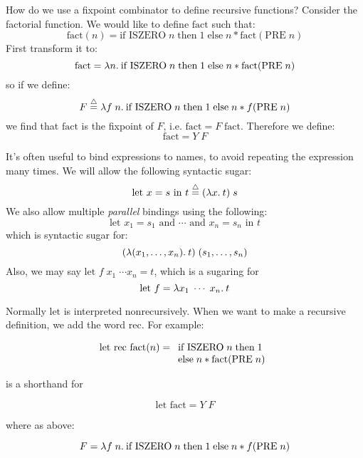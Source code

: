 \begin{slide*}


\vspace*{0.5cm}

How do we use a fixpoint combinator to define recursive functions? Consider the
factorial function. We would like to define {\red $\mbox{fact}$} such that:
{\red $$ \mbox{fact}(n) = \mbox{if ISZERO}\; n\; \mbox{then}\; 1\;
         \mbox{else}\; n * \mbox{fact}(\mbox{PRE}\; n) $$}
\noindent First transform it to:
{\red $$ \mbox{fact} = \lambda n.\: \mbox{if ISZERO}\; n\; \mbox{then}\; 1\;
    \mbox{else}\; n * \mbox{fact}(\mbox{PRE}\; n) $$}
\noindent so if we define:
{\red $$F \stackrel{\bigtriangleup}{=} \lambda f\; n.\: \mbox{if ISZERO}\; n\; \mbox{then}\; 1\;
    \mbox{else}\; n * f(\mbox{PRE}\; n)$$}
we find that {\red $\mbox{fact}$} is the fixpoint of {\red $F$}, i.e. {\red
$\mbox{fact} = F\; \mbox{fact}$}. Therefore we define:
{\red $$\mbox{fact} = Y\; F$$}

\end{slide*}



\begin{slide*}


\vspace*{0.5cm}

It's often useful to bind expressions to names, to avoid repeating the
expression many times. We will allow the following syntactic sugar:
{\red $$ \mbox{let } x = s \mbox{ in } t \stackrel{\bigtriangleup}{=} (\lambda x.\: t)\; s $$}
We also allow multiple {\em parallel} bindings using the following:
{\red $$ \mbox{let } x_1 = s_1 \mbox{ and } \cdots \mbox{ and } x_n = s_n
         \mbox{ in } t $$}
which is syntactic sugar for:
{\red $$ (\lambda (x_1,\ldots,x_n).\: t)\; (s_1,\ldots,s_n) $$}
Also, we may say {\red $\mbox{let } f\; x_1\; \cdots x_n = t$},
which is a sugaring for
{\red $$\mbox{let } f = \lambda x_1\; \cdots \; x_n.\: t$$}
\end{slide*}



\begin{slide*}


\vspace*{0.5cm}

Normally {\red $\mbox{let}$} is interpreted nonrecursively. When we want to
make a recursive definition, we add the word {\red $\mbox{rec}$}. For example:

{\red $$ \mbox{let rec fact}(n) = \begin{array}[t]{l} \mbox{if ISZERO}\; n\; \mbox{then}\; 1\\
                         \mbox{else}\; n * \mbox{fact}(\mbox{PRE}\; n) \end{array} $$}

is a shorthand for

{\red $$\mbox{let fact} = Y\; F$$}

where as above:

{\red $$F = \lambda f\; n.\: \mbox{if ISZERO}\; n\; \mbox{then}\; 1\;
         \mbox{else}\; n * f(\mbox{PRE}\; n)$$}
\end{slide*}



